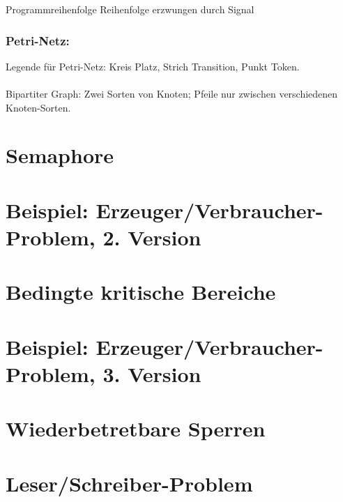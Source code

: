 Programmreihenfolge
Reihenfolge erzwungen durch Signal

\subsubsection*{Petri-Netz:} %
Legende für Petri-Netz: Kreis Platz, Strich Transition, Punkt Token.\\
\\
Bipartiter Graph: Zwei Sorten von Knoten; Pfeile nur zwischen verschiedenen Knoten-Sorten.

\section{Semaphore}

\section[Beispiel: Erzeuger/Verbraucher (2)]{Beispiel: Erzeuger/Verbraucher-Problem, 2. Version}

\section{Bedingte kritische Bereiche}

\section[Beispiel: Erzeuger/Verbraucher (3)]{Beispiel: Erzeuger/Verbraucher-Problem, 3. Version}

\section{Wiederbetretbare Sperren}

\section{Leser/Schreiber-Problem}